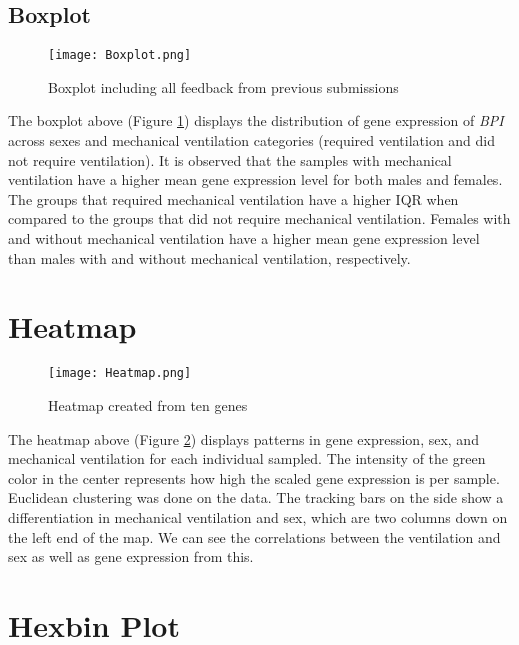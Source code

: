 \documentclass{article}
\begin{document}
\newpage
\subsection{Boxplot}
\begin{figure}[h]
    \centering
    \texttt{[image: Boxplot.png]}
    \caption{Boxplot including all feedback from previous submissions}
    \label{fig:box}
\end{figure}

The boxplot above (Figure \ref{fig:box}) displays the distribution of gene expression of \emph{BPI} across sexes and mechanical ventilation categories (required ventilation and did not require ventilation). It is observed that the samples with mechanical ventilation have a higher mean gene expression level for both males and females. The groups that required mechanical ventilation have a higher IQR when compared to the groups that did not require mechanical ventilation. Females with and without mechanical ventilation have a higher mean gene expression level than males with and without mechanical ventilation, respectively. 

\newpage

\section{Heatmap}

\begin{figure}[h]
    \centering
    \texttt{[image: Heatmap.png]}
    \caption{Heatmap created from ten genes}
    \label{fig:heat}

\end{figure}

The heatmap above (Figure \ref{fig:heat}) displays patterns in gene expression, sex, and mechanical ventilation for each individual sampled. The intensity of the green color in the center represents how high the scaled gene expression is per sample. Euclidean clustering was done on the data. The tracking bars on the side show a differentiation in mechanical ventilation and sex, which are two columns down on the left end of the map. We can see the correlations between the ventilation and sex as well as gene expression from this. 

\newpage

\section{Hexbin Plot}
\end{document}
